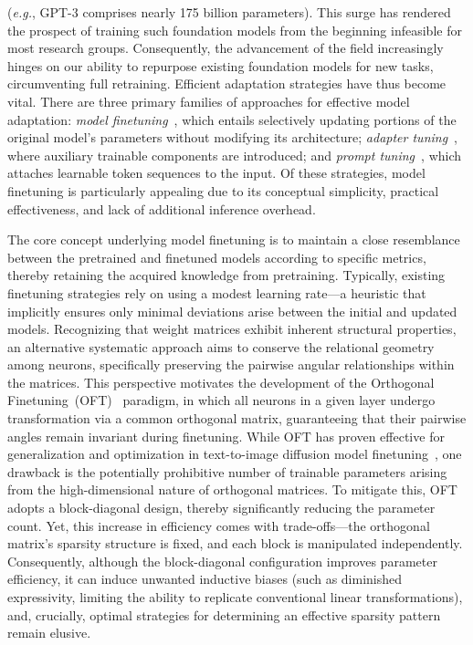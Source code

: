 (\emph{e.g.}, GPT-3 comprises nearly 175 billion parameters). This surge has rendered the prospect of training such foundation models from the beginning infeasible for most research groups. Consequently, the advancement of the field increasingly hinges on our ability to repurpose existing foundation models for new tasks, circumventing full retraining. Efficient adaptation strategies have thus become vital. There are three primary families of approaches for effective model adaptation: \emph{model finetuning}~\cite{hulora2022,zaken2022bitfit,guo2020parameter,raffel2020exploring,qiu2023controlling,zhang2022adaptive,chavan2023one}, which entails selectively updating portions of the original model’s parameters without modifying its architecture; \emph{adapter tuning}~\cite{rebuffi2017learning,houlsby2019parameter,pfeiffer2020adapterfusion,lin2020exploring,he2021towards}, where auxiliary trainable components are introduced; and \emph{prompt tuning}~\cite{li2021prefix,lester2021power}, which attaches learnable token sequences to the input. Of these strategies, model finetuning is particularly appealing due to its conceptual simplicity, practical effectiveness, and lack of additional inference overhead.

The core concept underlying model finetuning is to maintain a close resemblance between the pretrained and finetuned models according to specific metrics, thereby retaining the acquired knowledge from pretraining. Typically, existing finetuning strategies rely on using a modest learning rate—a heuristic that implicitly ensures only minimal deviations arise between the initial and updated models. Recognizing that weight matrices exhibit inherent structural properties, an alternative systematic approach aims to conserve the relational geometry among neurons, specifically preserving the pairwise angular relationships within the matrices. This perspective motivates the development of the Orthogonal Finetuning~(OFT)~\cite{qiu2023controlling} paradigm, in which all neurons in a given layer undergo transformation via a common orthogonal matrix, guaranteeing that their pairwise angles remain invariant during finetuning. While OFT has proven effective for generalization and optimization in text-to-image diffusion model finetuning~\cite{qiu2023controlling}, one drawback is the potentially prohibitive number of trainable parameters arising from the high-dimensional nature of orthogonal matrices. To mitigate this, OFT adopts a block-diagonal design, thereby significantly reducing the parameter count. Yet, this increase in efficiency comes with trade-offs—the orthogonal matrix’s sparsity structure is fixed, and each block is manipulated independently. Consequently, although the block-diagonal configuration improves parameter efficiency, it can induce unwanted inductive biases (such as diminished expressivity, limiting the ability to replicate conventional linear transformations), and, crucially, optimal strategies for determining an effective sparsity pattern remain elusive.


